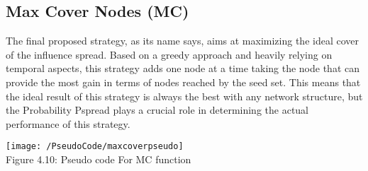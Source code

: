 \subsection{Max Cover Nodes (MC)}
\label{sec:maxcover}
The final proposed strategy, as its name says, aims at maximizing the ideal cover of the influence spread. Based on a greedy approach and heavily relying on temporal aspects, this strategy adds one node at a time taking the node that can provide the most gain in terms of nodes reached by the seed set. This means that the ideal result of this strategy is always the best with any network structure, but the Probability Pspread plays a crucial role in determining the actual performance of this strategy.

\begin{center}
    \texttt{[image: /PseudoCode/maxcoverpseudo]}
    \\
    Figure 4.10: Pseudo code For MC function
\end{center}
